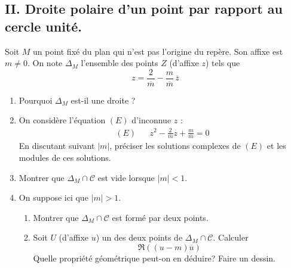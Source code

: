 \subsection*{II. Droite polaire d'un point par rapport au cercle unité.}
Soit $M$ un point fixé du plan qui n'est pas l'origine du repère. Son affixe est $m\neq 0$. On note $\Delta_M$ l'ensemble des points $Z$ (d'affixe $z$) tels que
\begin{displaymath}
 z = \frac{2}{\overline{m}} - \frac{m}{\overline{m}}\, \overline{z}
\end{displaymath}
\begin{enumerate}
 \item Pourquoi $\Delta _M$ est-il une droite ?
 \item On considère l'équation $(E)$ d'inconnue $z$ :
\begin{align*}
(E) &  & z^2 - \frac{2}{\overline{m}}z + \frac{m}{\overline{m}}=0 
\end{align*}
En discutant suivant $|m|$, préciser les solutions complexes de $(E)$ et les modules de ces solutions.
\item Montrer que $\Delta_M \cap \mathcal C$ est vide lorsque $|m|<1$.
\item On suppose ici que  $|m|>1$.
\begin{enumerate}
 \item Montrer que $\Delta_M \cap \mathcal C$ est formé par deux points.
 \item Soit $U$ (d'affixe $u$) un des deux points de $\Delta_M \cap \mathcal C$. Calculer
\begin{displaymath}
 \Re\left( (u-m)\overline{u}\right) 
\end{displaymath}
 Quelle propriété géométrique peut-on en déduire? Faire un dessin.
\end{enumerate}
\end{enumerate}


